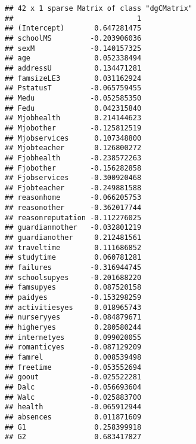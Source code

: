 \documentclass[
]{article}
\newenvironment{Shaded}{\begin{snugshade}}{\end{snugshade}}
\newcommand{\AttributeTok}[1]{\textcolor[rgb]{0.77,0.63,0.00}{#1}}
\newcommand{\DecValTok}[1]{\textcolor[rgb]{0.00,0.00,0.81}{#1}}
\newcommand{\FunctionTok}[1]{\textcolor[rgb]{0.00,0.00,0.00}{#1}}
\newcommand{\NormalTok}[1]{#1}
\newcommand{\OtherTok}[1]{\textcolor[rgb]{0.56,0.35,0.01}{#1}}
\newcommand{\SpecialCharTok}[1]{\textcolor[rgb]{0.00,0.00,0.00}{#1}}
\begin{document}
\begin{verbatim}
## 42 x 1 sparse Matrix of class "dgCMatrix"
##                             1
## (Intercept)       0.647281475
## schoolMS         -0.203906036
## sexM             -0.140157325
## age               0.052338494
## addressU          0.134471281
## famsizeLE3        0.031162924
## PstatusT         -0.065759455
## Medu             -0.052585350
## Fedu              0.042315840
## Mjobhealth        0.214144623
## Mjobother        -0.125812519
## Mjobservices      0.107348800
## Mjobteacher       0.126800272
## Fjobhealth       -0.238572263
## Fjobother        -0.156282858
## Fjobservices     -0.300920468
## Fjobteacher      -0.249881588
## reasonhome       -0.066205753
## reasonother      -0.362017744
## reasonreputation -0.112276025
## guardianmother   -0.032801219
## guardianother     0.212481561
## traveltime        0.111686852
## studytime         0.060781281
## failures         -0.316944745
## schoolsupyes     -0.201688220
## famsupyes         0.087520158
## paidyes          -0.153298259
## activitiesyes     0.018965743
## nurseryyes       -0.084879671
## higheryes         0.280580244
## internetyes       0.099020055
## romanticyes      -0.087129209
## famrel            0.008539498
## freetime         -0.053552694
## goout            -0.025522281
## Dalc             -0.056693604
## Walc             -0.025883700
## health           -0.065912944
## absences          0.011871609
## G1                0.258399918
## G2                0.683417827
\end{verbatim}

\begin{Shaded}
\end{Shaded}
\end{document}
